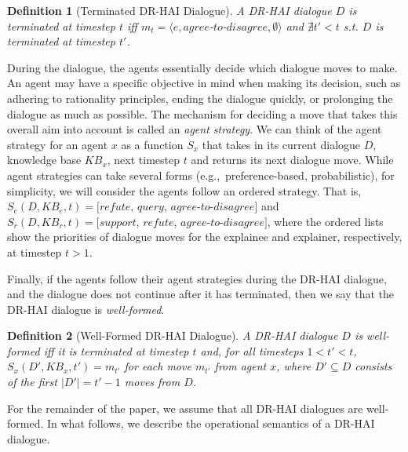 \documentclass{ecai}
\newtheorem{definition}{{\bf Definition}}
\begin{document}
\begin{definition}[Terminated DR-HAI Dialogue]
\label{def:term}
    A DR-HAI dialogue $D$ is \emph{terminated} at timestep $t$ iff $m_t = \langle e, agree$-$to$-$disagree, \emptyset \rangle$ and $\nexists t'<t$ s.t. $D$ is terminated at timestep $t'$.
\end{definition}

During the dialogue, the agents essentially decide which dialogue moves to make. An agent may have a specific objective in mind when making its decision, such as adhering to rationality principles, ending the dialogue quickly, or prolonging the dialogue as much as possible. The mechanism for deciding a move that takes this overall aim into account is called an \emph{agent strategy}. We can think of the agent strategy for an agent $x$ as a function $S_x$ that takes in its current dialogue $D$, knowledge base $KB_x$, next timestep $t$ and returns its next dialogue move. 
%
%
While agent strategies can take several forms (e.g.,~preference-based, probabilistic), for simplicity, we will consider the agents follow an ordered strategy. That is, $S_e(D, KB_e, t) = [refute$, $query$, $agree$-$to$-$disagree]$ and $S_r(D, KB_r, t) = [support$, $refute$, $agree$-$to$-$disagree]$, where the ordered lists show the priorities of dialogue moves for the explainee and explainer, respectively, at timestep $t > 1$.






Finally, if the agents follow their agent strategies during the DR-HAI dialogue, and the dialogue does not continue after it has terminated, then we say that the DR-HAI dialogue is \emph{well-formed}.

\begin{definition}[Well-Formed DR-HAI Dialogue]
A DR-HAI dialogue $D$ is \emph{well-formed} iff it is terminated at timestep $t$ and, for all timesteps $1<t'<t$, $S_x(D', KB_x, t') = m_{t'}$ for each move $m_{t'}$ from agent $x$, where $D' \subseteq D$ consists of the first $|D'| = t' - 1$ moves from $D$.
\end{definition}

For the remainder of the paper, we assume that all DR-HAI dialogues are well-formed. In what follows, we describe the operational semantics of a DR-HAI dialogue.
\end{document}
